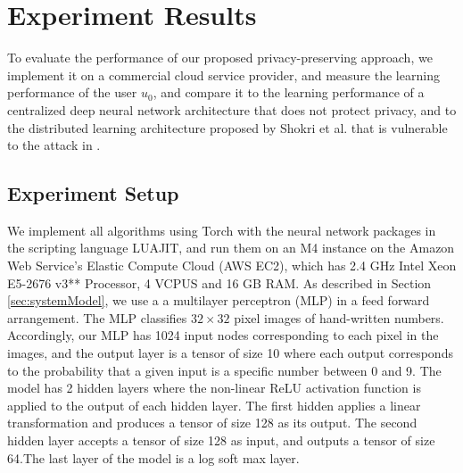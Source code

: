 \documentclass[conference]{IEEEtran}
\begin{document}
\section{Experiment Results}

To evaluate the performance of our proposed privacy-preserving approach, we implement it on a commercial cloud service provider, and
measure the learning performance of the user $u_0$, and compare it to the learning performance of a centralized deep neural network
architecture that does not protect privacy, and to the distributed learning architecture proposed by Shokri et al. 
\cite{shokri2015privacy} that is vulnerable to the attack in \cite{hitaj2017deep}.

\subsection{Experiment Setup}
We implement all algorithms using Torch with the neural network packages in the scripting language LUAJIT, and run them on an M4
instance on the Amazon Web Service's Elastic Compute Cloud (AWS EC2), which has
2.4 GHz Intel Xeon E5-2676 v3** Processor, 4 VCPUS and 16 GB RAM.
As described in Section \ref{sec:systemModel}, we use a 
a multilayer perceptron (MLP) in a feed forward arrangement. The MLP classifies $32\times 32$ pixel images of hand-written numbers. 
Accordingly, our MLP has 1024 input nodes corresponding to each
pixel in the images, and the output layer is a tensor of size 10 where each output corresponds to the probability
that a given input is a specific number
between 0 and 9.  The model has 2 hidden layers where the non-linear ReLU activation function is applied to the
output of each hidden layer.  The first hidden applies a linear transformation
and produces a tensor of size 128 as its output. The second hidden layer accepts a tensor of size 128 as input, and outputs a tensor of
size 64.The last layer of the model is a log soft max layer. 
\end{document}
